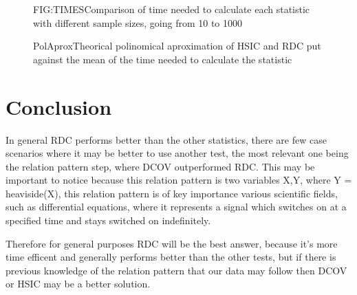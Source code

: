 \begin{figure}[Time comparison]{FIG:TIMES}{Comparison of time needed to calculate each statistic with different sample sizes, going from 10 to 1000}
\end{figure}

\begin{figure}[Polinomical aproximation for HSIC and RDC time curve]{PolAprox}{Theorical polinomical aproximation of HSIC and RDC put against the mean of the time needed to calculate the statistic}
\end{figure}

\section{Conclusion}

In general RDC performs better than the other statistics, there are few case scenarios where it may be better to use another test, the most relevant one being the relation pattern step, where DCOV outperformed RDC. This may be important to notice because this relation pattern is two variables X,Y, where Y = heaviside(X), this relation pattern is of key importance various scientific fields, such as differential equations, where it represents a signal which switches on at a specified time and stays switched on indefinitely. 

Therefore for general purposes RDC will be the best answer, because it's more time efficent and generally performs better than the other tests, but if there is previous knowledge of the relation pattern that our data may follow then DCOV or HSIC may be a better solution.